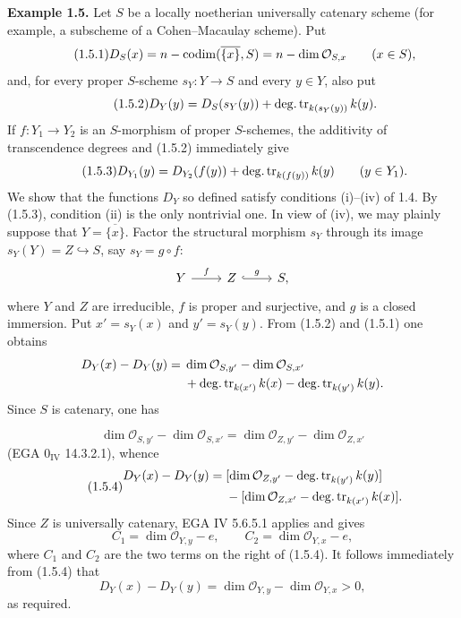 \textbf{Example 1.5.}
Let $S$ be a locally noetherian universally catenary scheme (for example, a
subscheme of a Cohen--Macaulay scheme). Put
\begin{equation}\tag{1.5.1}
D_S(x)=n-\operatorname{codim}(\overline{\{x\}},S)
      =n-\dim\mathcal O_{S,x}\qquad(x\in S),
\end{equation}
and, for every proper $S$-scheme $s_Y:Y\to S$ and every $y\in Y$, also put
\begin{equation}\tag{1.5.2}
D_Y(y)=D_S(s_Y(y))+\operatorname{deg.tr}_{k(s_Y(y))}k(y).
\end{equation}
If $f:Y_1\to Y_2$ is an $S$-morphism of proper $S$-schemes, the additivity of
transcendence degrees and (1.5.2) immediately give
\begin{equation}\tag{1.5.3}
D_{Y_1}(y)=D_{Y_2}(f(y))+\operatorname{deg.tr}_{k(f(y))}k(y)
\qquad(y\in Y_1).
\end{equation}
We show that the functions $D_Y$ so defined satisfy conditions (i)--(iv) of
1.4. By (1.5.3), condition (ii) is the only nontrivial one. In view of (iv),
we may plainly suppose that $Y=\overline{\{x\}}$. Factor the structural
morphism $s_Y$ through its image $s_Y(Y)=Z\hookrightarrow S$, say
$s_Y=g\circ f$:
\[
\begin{tikzcd}
Y \arrow[r,"f"] & Z \arrow[r,hook,"g"] & S,
\end{tikzcd}
\]
where $Y$ and $Z$ are irreducible, $f$ is proper and surjective, and $g$ is a
closed immersion. Put $x'=s_Y(x)$ and $y'=s_Y(y)$. From (1.5.2) and (1.5.1)
one obtains
\[
\begin{split}
D_Y(x)-D_Y(y)={}&\dim\mathcal O_{S,y'}-\dim\mathcal O_{S,x'}\\
&+\operatorname{deg.tr}_{k(x')}k(x)-\operatorname{deg.tr}_{k(y')}k(y).
\end{split}
\]
Since $S$ is catenary, one has

\[
\dim\mathcal O_{S,y'}-\dim\mathcal O_{S,x'}
=\dim\mathcal O_{Z,y'}-\dim\mathcal O_{Z,x'}
\]
(EGA $0_{\mathrm{IV}}$ 14.3.2.1), whence
\begin{equation}\tag{1.5.4}
\begin{split}
D_Y(x)-D_Y(y)={}&
[\dim\mathcal O_{Z,y'}-\operatorname{deg.tr}_{k(y')}k(y)]\\
&-[\dim\mathcal O_{Z,x'}-\operatorname{deg.tr}_{k(x')}k(x)].
\end{split}
\end{equation}
Since $Z$ is universally catenary, EGA IV 5.6.5.1 applies and gives
\[
C_1=\dim\mathcal O_{Y,y}-e,
\qquad
C_2=\dim\mathcal O_{Y,x}-e,
\]
where $C_1$ and $C_2$ are the two terms on the right of (1.5.4). It follows
immediately from (1.5.4) that
\[
D_Y(x)-D_Y(y)
=\dim\mathcal O_{Y,y}-\dim\mathcal O_{Y,x}>0,
\]
as required.

